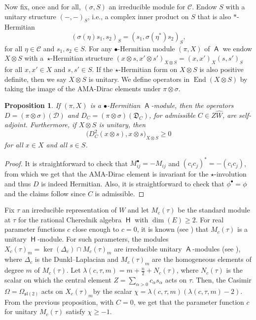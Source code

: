 \documentclass[10pt,a4paper]{amsart}
\numberwithin{equation}{section}
\newtheorem{Proposition}[Theorem]{Proposition}
 { \theoremstyle{definition}
\newtheorem{Definition}[Theorem]{Definition}
\newtheorem{Note}[Theorem]{Note}
\newtheorem{Example}[Theorem]{Example}
\newtheorem{Remark}[Theorem]{Remark} }
\DeclareMathOperator{\End}{End}
\newcommand{\fl}{\mathfrak{l}}
\newcommand{\fs}{\mathfrak{s}}
\newcommand{\Cc}{\mathcal{C}}
\DeclareMathOperator{\rca}{\mathsf{H}}
\DeclareMathOperator{\ama}{\mathsf{A}}
\begin{document}
Now fix, once and for all, $(\sigma,S)$ an irreducible module for $\Cc$.
Endow $S$ with a unitary structure $(-,-)_S$, i.e., a complex inner product on $S$ that is also $\ast$-Hermitian
\[
(\sigma(\eta)s_1,s_2)_S = (s_1,\sigma(\eta^*)s_2)_S,
\]
for all $\eta\in\Cc$ and $s_1,s_2\in S$. For any $\bullet$-Hermitian module $(\pi,X)$ of $\ama$ we endow $X\otimes S$ with a~$\star$-Hermitian structure $(x\otimes s,x'\otimes s')_{X\otimes S} = (x,x')_X(s,s')_S$ for all $x,x'\in X$ and $s,s' \in S$. If the $\star$-Hermitian form on $X \otimes S$ is also positive definite, then we say $X \otimes S$ is unitary. We define operators in $\End(X\otimes S)$ by taking the image of the AMA-Dirac elements under $\pi\otimes\sigma$.

\begin{Proposition}
If $(\pi,X)$ is a $\bullet$-Hermitian $\ama$-module, then the operators $D = (\pi\otimes\sigma)(\mathcal{D})$ and $D_C = (\pi\otimes\sigma)(\mathfrak{D}_C)$, for admissible $C\in Z\hat{W}$, are self-adjoint. Furthermore, if $X\otimes S$ is unitary, then
\[
\big(D_C^2(x\otimes s),x\otimes s\big)_{X\otimes S} \geq 0
\]
for all $x \in X$ and all $s \in S$.
\end{Proposition}

\begin{proof}
It is straightforward to check that $M_{ij}^\bullet = -M_{ij}$ and $(c_ic_j)^* = -(c_ic_j)$, from which we get that the AMA-Dirac element is invariant for the $\star$-involution and thus $D$ is indeed Hermitian. Also, it is straightforward to check that $\phi^\bullet = \phi$ and the claims follow since $C$ is admissible.
\end{proof}

\begin{Example}\label{e:harmonicex}
Fix $\tau$ an irreducible representation of $W$ and let $M_c(\tau)$ be the standard module at $\tau$ for the rational Cherednik algebra $\rca$ with $\dim(E) \geq 2$. For real parameter functions $c$ close enough to $c=0$, it is known (see \cite{ES09}) that $M_c(\tau)$ is a unitary $\rca$-module. For such parameters, the modules $X_c(\tau)_m = \ker(\Delta_c)\cap M_c(\tau)_m$ are irreducible unitary $\ama$-modules (see \cite[Theorem~B]{CDM20}), where $\Delta_c$ is the Dunkl--Laplacian and $M_c(\tau)_m$ are the homogeneous elements of degree $m$ of $M_c(\tau)$. Let $\lambda(c,\tau,m)=m + \tfrac{n}{2} + N_c(\tau)$, where $N_c(\tau)$ is the scalar on which the central element $Z = \sum_{\alpha>0} c_\alpha s_\alpha$ acts on $\tau$. Then, the Casimir $\Omega = \Omega_{\fs\fl(2)}$ acts on $X_c(\tau)_m$by the scalar $\chi = \lambda(c,\tau,m)(\lambda(c,\tau,m) - 2)$. From the previous proposition, with $C=0$, we get that the parameter function $c$ for unitary $M_c(\tau)$ satisfy $\chi \geq -1$.
\end{Example}
\end{document}
